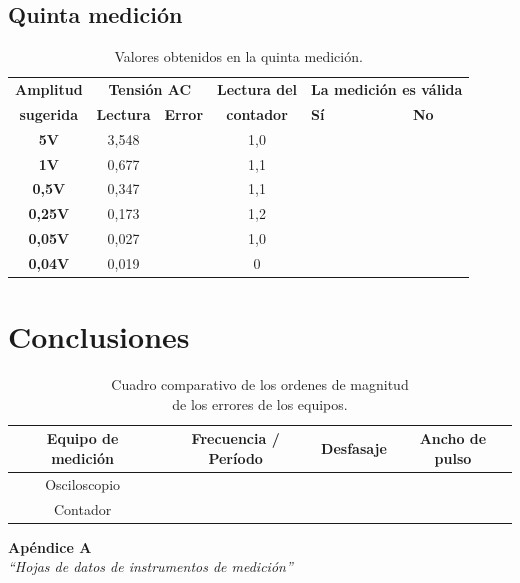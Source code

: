 \documentclass{article}
\newcommand{\tick}{\ding{52}}
\begin{document}
\subsection{Quinta medición}


\begin{table}[!hbt]
	\begin{center}

		\begin{tabular}{|c|c|c|c|>{\centering}p{1.65cm}|c|} \hline
			\textbf{Amplitud} & \multicolumn{2}{c|}{\textbf{Tensión AC}} & \textbf{Lectura del} & \multicolumn{2}{c|}{\textbf{La medición es válida}} \\\cline{2-3}\cline{5-6}
			\textbf{sugerida} & \textbf{Lectura} & \textbf{Error} & \textbf{contador} & \textbf{Sí} & \textbf{No} \\\hline
			
			\textbf{5V} & 3,548 &  & 1,0 & \tick &  \\\hline
			\textbf{1V} & 0,677 &  & 1,1 &  &  \\\hline
			\textbf{0,5V} & 0,347 &  & 1,1 &  &  \\\hline
			\textbf{0,25V} & 0,173 &  & 1,2 &  &  \\\hline
			\textbf{0,05V} & 0,027 &  & 1,0 &  &  \\\hline
			\textbf{0,04V} & 0,019 &  & 0 &  &  \\\hline

		\end{tabular}

	\caption{Valores obtenidos en la quinta medición.}
	\end{center}
\end{table}
\medskip




\section{Conclusiones}

\begin{table}[!hbt]
	\begin{center}
		\begin{tabular}{|c|c|c|c|} \hline
			\textbf{Equipo de medición} & \textbf{Frecuencia / Período} & \textbf{Desfasaje} & \textbf{Ancho de pulso} \\\hline
			Osciloscopio &  &  &  \\\hline
			Contador &  &  &  \\\hline
		\end{tabular}

	\caption{Cuadro comparativo de los ordenes de magnitud\\ de los errores de los equipos.}
	\end{center}
\end{table}
\medskip
	


\newpage \textit{}
\newpage



\newpage
\vspace*{4cm}
\begin{center}
	\textbf{\Huge{Apéndice A}} \\
	\bigskip\bigskip
	\Large{\textit{``Hojas de datos de instrumentos de medición''}}
\end{center}


\newpage \textit{}
\newpage
\end{document}
